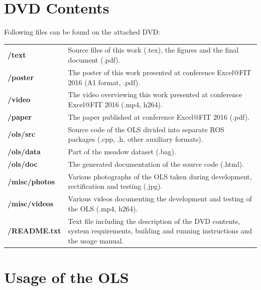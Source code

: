 \chapter{DVD Contents}

Following files can be found on the attached DVD:

{\renewcommand{\arraystretch}{1.2}
\begin{table}[htbp]
	\centering
	\begin{tabularx}{1.0\textwidth}{lX}
		\textbf{/text} & Source files of this work (.tex), the figures and the final document (.pdf). \\
		\textbf{/poster} & The poster of this work presented at conference Excel@FIT 2016 (A1 format, .pdf). \\
		\textbf{/video} & The video  overviewing this work presented at conference Excel@FIT 2016 (.mp4, h264). \\
		\textbf{/paper} & The paper published at conference Excel@FIT 2016 (.pdf). \\
		\textbf{/ols/src} & Source code of the OLS divided into separate ROS packages (.cpp, .h, other auxiliary formats). \\
		\textbf{/ols/data} & Part of the meadow dataset (.bag). \\
		\textbf{/ols/doc} & The generated documentation of the source code (.html). \\
		\textbf{/misc/photos} & Various photographs of the OLS taken during development, rectification and testing (.jpg). \\
		\textbf{/misc/videos} & Various videos documenting the development and testing of the OLS (.mp4, h264). \\
		\textbf{/README.txt} & Text file including the description of the DVD contents, system requirements, building and running instructions and the usage manual. \\
	\end{tabularx}
	\label{tab:dvd_contents}
\end{table}%
}

\chapter{Usage of the OLS}

